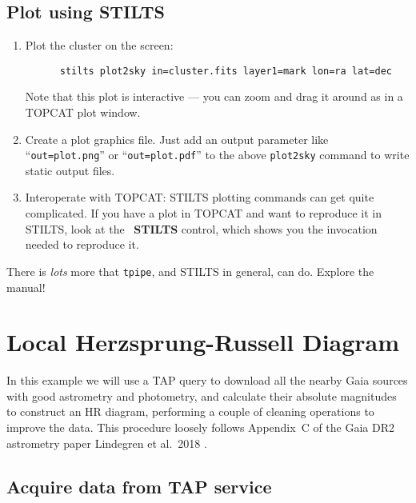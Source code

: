 \documentclass{article}
\newcommand{\buttimg}[1] %
           {\mbox{\vtop{\vskip-2ex\hbox{\includegraphics[height=3ex]
                                                        {icons/#1}}}}}
\newcommand{\lab}[1]{{\bf #1}}
\newcommand{\ma}[2]{\buttimg{#1}~\lab{#2}}
\begin{document}
\subsection{Plot using STILTS}

\begin{enumerate}
\item Plot the cluster on the screen:
      \preverb
      \begin{verbatim}
      stilts plot2sky in=cluster.fits layer1=mark lon=ra lat=dec
      \end{verbatim}
      \postverb
      Note that this plot is interactive --- you can zoom and drag
      it around as in a TOPCAT plot window.
\item Create a plot graphics file.
      Just add an output parameter like ``{\tt out=plot.png}'' or
      ``{\tt out=plot.pdf}'' to the above {\tt plot2sky} command
      to write static output files.
\item Interoperate with TOPCAT:
      STILTS plotting commands can get quite complicated.
      If you have a plot in TOPCAT and want to reproduce it in STILTS,
      look at the \ma{stilts.png}{STILTS} control,
      which shows you the invocation needed to reproduce it.
\end{enumerate}

There is {\em lots} more that {\tt tpipe}, and STILTS in general, can do.
Explore the manual!


\newpage
\section{Local Herzsprung-Russell Diagram}
\label{sec:hrd}

In this example we will use a TAP query to download
all the nearby Gaia sources with good astrometry and photometry,
and calculate their absolute magnitudes to construct an HR diagram,
performing a couple of cleaning operations to improve the data.
This procedure loosely follows
Appendix~C of the Gaia DR2 astrometry paper
Lindegren et al.\ 2018 \cite{lindegren}.

\subsection{Acquire data from TAP service}
\label{sec:hrd-tap}
\end{document}

